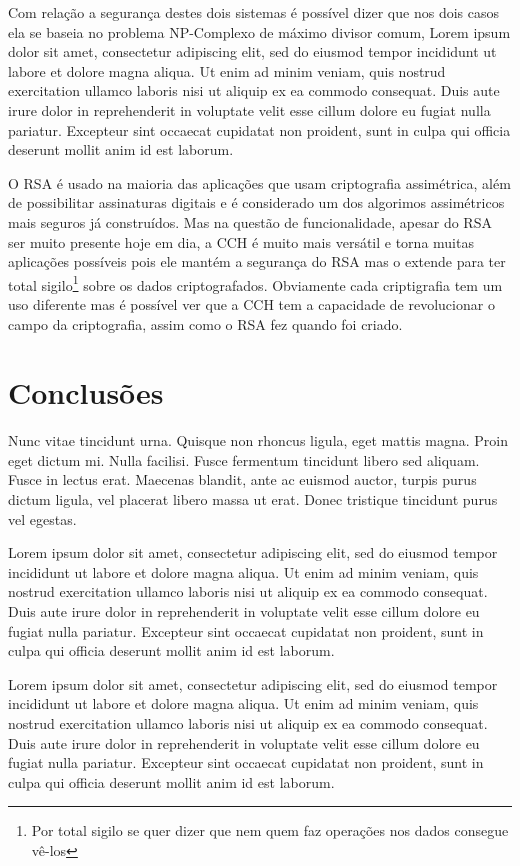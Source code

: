 	Com relação a segurança destes dois sistemas é possível dizer que nos dois casos ela se baseia no problema NP-Complexo de máximo divisor comum,
	Lorem ipsum dolor sit amet, consectetur adipiscing elit, sed do eiusmod tempor incididunt ut labore et dolore magna aliqua. Ut enim ad minim veniam, quis nostrud exercitation ullamco laboris nisi ut aliquip ex ea commodo consequat. Duis aute irure dolor in reprehenderit in voluptate velit esse cillum dolore eu fugiat nulla pariatur. Excepteur sint occaecat cupidatat non proident, sunt in culpa qui officia deserunt mollit anim id est laborum.
	
	O RSA é usado na maioria das aplicações que usam criptografia assimétrica, além de possibilitar assinaturas digitais e é considerado um dos algorimos assimétricos mais seguros já construídos.
	Mas na questão de funcionalidade, apesar do RSA ser muito presente hoje em dia, a CCH é muito mais versátil e torna muitas aplicações possíveis pois ele mantém a segurança do RSA mas o extende para ter total sigilo\footnote{Por total sigilo se quer dizer que nem quem faz operações nos dados consegue vê-los} sobre os dados criptografados.
	Obviamente cada criptigrafia tem um uso diferente mas é possível ver que a CCH tem a capacidade de revolucionar o campo da criptografia, assim como o RSA fez quando foi criado.

\newpage

\section{Conclusões}\label{sec:LABEL_CHP_1_SEC_J}
Nunc vitae tincidunt urna. Quisque non rhoncus ligula, eget mattis magna. Proin eget dictum mi. Nulla facilisi. Fusce fermentum tincidunt libero sed aliquam. Fusce in lectus erat. Maecenas blandit, ante ac euismod auctor, turpis purus dictum ligula, vel placerat libero massa ut erat. Donec tristique tincidunt purus vel egestas.

Lorem ipsum dolor sit amet, consectetur adipiscing elit, sed do eiusmod tempor incididunt ut labore et dolore magna aliqua. Ut enim ad minim veniam, quis nostrud exercitation ullamco laboris nisi ut aliquip ex ea commodo consequat. Duis aute irure dolor in reprehenderit in voluptate velit esse cillum dolore eu fugiat nulla pariatur. Excepteur sint occaecat cupidatat non proident, sunt in culpa qui officia deserunt mollit anim id est laborum.

Lorem ipsum dolor sit amet, consectetur adipiscing elit, sed do eiusmod tempor incididunt ut labore et dolore magna aliqua. Ut enim ad minim veniam, quis nostrud exercitation ullamco laboris nisi ut aliquip ex ea commodo consequat. Duis aute irure dolor in reprehenderit in voluptate velit esse cillum dolore eu fugiat nulla pariatur. Excepteur sint occaecat cupidatat non proident, sunt in culpa qui officia deserunt mollit anim id est laborum.